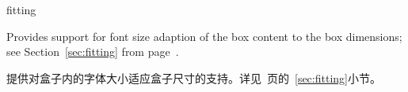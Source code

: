 

\begin{docTcbKey}[library]{fitting}{}{}

Provides support for font size adaption of the box content to
the box dimensions;
see Section~\ref{sec:fitting} from page~\pageref{sec:fitting}.

提供对盒子内的字体大小适应盒子尺寸的支持。详见~\pageref{sec:fitting}页的~\ref{sec:fitting}小节。

\end{docTcbKey}

% 
% 

% 
% 

% 
% 

% 
% 

% 
% 

